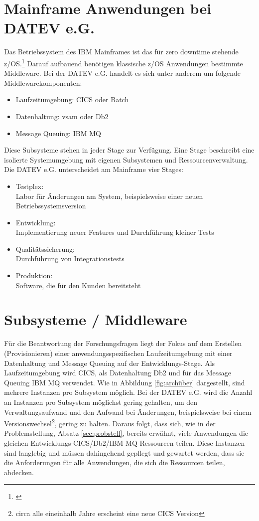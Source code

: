 \section{Mainframe Anwendungen bei DATEV e.G.}\label{sec:zosanw}
Das Betriebssystem des IBM Mainframes ist das für zero downtime stehende z/OS.\footnote{\cite[S. 92]{Ebbers.2011}}
Darauf aufbauend benötigen klassische z/OS Anwendungen bestimmte Middleware.
Bei der DATEV e.G. handelt es sich unter anderem um folgende Middlewarekomponenten:

\begin{itemize}
\item Laufzeitumgebung: CICS oder \Gls{Batch}
\item Datenhaltung: \Gls{vsam} oder Db2
\item Message Queuing: IBM MQ
\end{itemize}

Diese Subsysteme stehen in jeder Stage zur Verfügung.
Eine Stage beschreibt eine isolierte Systemumgebung mit eigenen Subsystemen und Ressourcenverwaltung.
Die DATEV e.G. unterscheidet am Mainframe vier Stages:
\begin{samepage}
\begin{itemize}
\item Testplex:\\
Labor für Änderungen am System, beispielsweise einer neuen Betriebssystemsversion
\item Entwicklung:\\
Implementierung neuer Features und Durchführung kleiner Tests
\item Qualitätssicherung:\\
Durchführung von Integrationstests
\item Produktion:\\
Software, die für den Kunden bereitsteht
\end{itemize}
\end{samepage}

\section{Subsysteme / Middleware}
Für die Beantwortung der Forschungsfragen liegt der Fokus auf dem Erstellen (\glqq Provisionieren\grqq) einer anwendungsspezifischen Laufzeitumgebung mit einer Datenhaltung und Message Queuing auf der Entwicklungs-Stage.
Als Laufzeitumgebung wird \glqq CICS\grqq, als Datenhaltung \glqq Db2\grqq{} und für das Message Queuing \glqq IBM MQ\grqq{} verwendet.
Wie in Abbildung \ref{fig:archüber} dargestellt, sind mehrere Instanzen pro Subsystem möglich.
Bei der DATEV e.G. wird die Anzahl an Instanzen pro Subsystem möglichst gering gehalten, um den Verwaltungsaufwand und den Aufwand bei Änderungen, beispielsweise bei einem Versionswechsel\footnote{circa alle eineinhalb Jahre erscheint eine neue CICS Version}, gering zu halten.
Daraus folgt, dass sich, wie in der Problemstellung, Absatz \ref{sec:probstell}, bereits erwähnt, viele Anwendungen die gleichen Entwicklungs-CICS/Db2/IBM MQ Ressourcen teilen.
Diese Instanzen sind langlebig und müssen dahingehend gepflegt und gewartet werden, dass sie die Anforderungen für alle Anwendungen, die sich die Ressourcen teilen, abdecken. 

